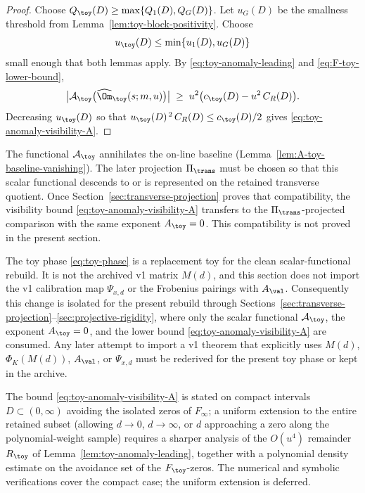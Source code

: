 \begin{proof}
Choose \(Q_\toy(D)\ge\max\{Q_1(D),Q_G(D)\}\).  Let \(u_G(D)\) be the
smallness threshold from Lemma~\ref{lem:toy-block-positivity}.  Choose
\[
        u_\toy(D)\le \min\{u_1(D),u_G(D)\}
\]
small enough that both lemmas apply.  By
\eqref{eq:toy-anomaly-leading} and \eqref{eq:F-toy-lower-bound},
\[
\bigl|\mathcal A_\toy\bigl(\widehat\Om_\toy(s;m,u)\bigr)\bigr|
\;\ge\;
u^2\bigl(c_\toy(D)-u^2\,C_R(D)\bigr).
\]
Decreasing \(u_\toy(D)\) so that \(u_\toy(D)^{\,2}\,C_R(D)\le c_\toy(D)/2\) gives
\eqref{eq:toy-anomaly-visibility-A}.
\end{proof}

\begin{remark}
\label{rem:toy-Pi-trans-deferred}
The functional \(\mathcal A_\toy\) annihilates the on-line baseline
(Lemma~\ref{lem:A-toy-baseline-vanishing}).  The later projection
\(\Pi_\trans\) must be chosen so that this scalar functional descends to
or is represented on the retained transverse quotient.  Once
Section~\ref{sec:transverse-projection} proves that compatibility, the
visibility bound \eqref{eq:toy-anomaly-visibility-A} transfers to the
\(\Pi_\trans\)-projected comparison with the same exponent
\(A_\toy=0\).  This compatibility is not proved in the present section.
\end{remark}


\begin{remark}
\label{rem:toy-phase-v1-compatibility}
The toy phase \eqref{eq:toy-phase} is a replacement toy for the clean
scalar-functional rebuild.  It is not the archived v1 matrix \(M(d)\),
and this section does not import the v1 calibration map
\(\Psi_{x,d}\) or the Frobenius pairings with \(A_{\val}\).  Consequently
this change is isolated for the present rebuild through
Sections~\ref{sec:transverse-projection}--\ref{sec:projective-rigidity},
where only the scalar functional \(\mathcal A_\toy\), the exponent
\(A_\toy=0\), and the lower bound \eqref{eq:toy-anomaly-visibility-A}
are consumed.  Any later attempt to import a v1 theorem that explicitly
uses \(M(d)\), \(\Phi_K(M(d))\), \(A_{\val}\), or \(\Psi_{x,d}\) must be
rederived for the present toy phase or kept in the archive.
\end{remark}

\begin{wip}\label{rem:wip-toy-anomaly-uniform-remainder}
The bound \eqref{eq:toy-anomaly-visibility-A} is stated on compact
intervals \(D\subset(0,\infty)\) avoiding the isolated zeros of
\(F_{\infty}\); a uniform extension to the entire retained subset
(allowing \(d\to 0\), \(d\to\infty\), or \(d\) approaching a
zero along the polynomial-weight sample) requires a sharper analysis
of the \(O(u^4)\) remainder \(R_\toy\) of
Lemma~\ref{lem:toy-anomaly-leading}, together with a polynomial
density estimate on the avoidance set of the \(F_\toy\)-zeros.
The numerical and symbolic verifications cover the compact case;
the uniform extension is deferred.
\end{wip}
